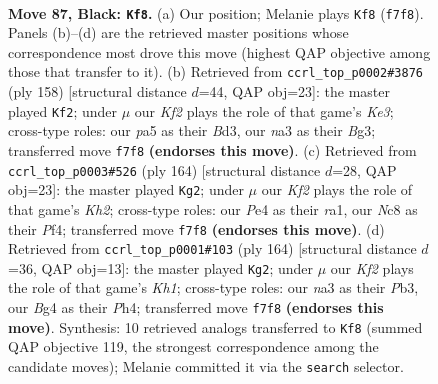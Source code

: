 \documentclass[11pt]{article}
\begin{document}
\clearpage

\begin{figure}[p]\centering
\begin{subfigure}{0.46\textwidth}\centering
\resizebox{\linewidth}{!}{%
\newchessgame
\chessboard[
  setfen={2n5/2P2k1K/p7/P4p1p/4pBb1/Nr4P1/8/R7 b - - 81 87},
  showmover=false,
  pgfstyle=straightmove, color=movearrow, markmove={f7-f8}
]}
\caption{}
\end{subfigure}\hfill
\begin{subfigure}{0.46\textwidth}\centering
\resizebox{\linewidth}{!}{%
\newchessgame
\chessboard[
  setfen={4k3/1b6/p5p1/P2P1pP1/1PP5/3BK1Br/8/8 w - - 3 80},
  showmover=false,
  pgfstyle=straightmove, color=movearrow, markmove={e3-f2}
]}
\caption{}
\end{subfigure}
\\[4pt]
\begin{subfigure}{0.46\textwidth}\centering
\resizebox{\linewidth}{!}{%
\newchessgame
\chessboard[
  setfen={8/7p/1p3k2/1BbR1p1P/P1P2P2/8/7K/r7 w - - 85 83},
  showmover=false,
  pgfstyle=straightmove, color=movearrow, markmove={h2-g2}
]}
\caption{}
\end{subfigure}\hfill
\begin{subfigure}{0.46\textwidth}\centering
\resizebox{\linewidth}{!}{%
\newchessgame
\chessboard[
  setfen={5k2/2b5/5p2/pR3B1p/P3P2P/1Pr5/8/7K w - - 1 83},
  showmover=false,
  pgfstyle=straightmove, color=movearrow, markmove={h1-g2}
]}
\caption{}
\end{subfigure}
\caption{\textbf{Move 87, Black: \texttt{Kf8}.} (a) Our position; Melanie plays \texttt{Kf8} (\texttt{f7f8}). Panels (b)--(d) are the retrieved master positions whose correspondence most drove this move (highest QAP objective among those that transfer to it). (b) Retrieved from \texttt{ccrl\_top\_p0002\#3876} (ply 158) [structural distance $d$=44, QAP obj=23]: the master played \texttt{Kf2}; under $\mu$ our \emph{Kf2} plays the role of that game's \emph{Ke3}; cross-type roles: our \emph{p}a5 as their \emph{B}d3, our \emph{n}a3 as their \emph{B}g3; transferred move \texttt{f7f8} \textbf{(endorses this move)}. (c) Retrieved from \texttt{ccrl\_top\_p0003\#526} (ply 164) [structural distance $d$=28, QAP obj=23]: the master played \texttt{Kg2}; under $\mu$ our \emph{Kf2} plays the role of that game's \emph{Kh2}; cross-type roles: our \emph{P}e4 as their \emph{r}a1, our \emph{N}c8 as their \emph{P}f4; transferred move \texttt{f7f8} \textbf{(endorses this move)}. (d) Retrieved from \texttt{ccrl\_top\_p0001\#103} (ply 164) [structural distance $d$=36, QAP obj=13]: the master played \texttt{Kg2}; under $\mu$ our \emph{Kf2} plays the role of that game's \emph{Kh1}; cross-type roles: our \emph{n}a3 as their \emph{P}b3, our \emph{B}g4 as their \emph{P}h4; transferred move \texttt{f7f8} \textbf{(endorses this move)}. Synthesis: 10 retrieved analogs transferred to \texttt{Kf8} (summed QAP objective 119, the strongest correspondence among the candidate moves); Melanie committed it via the \texttt{search} selector.}
\label{fig:thought-m173}
\end{figure}
\end{document}
